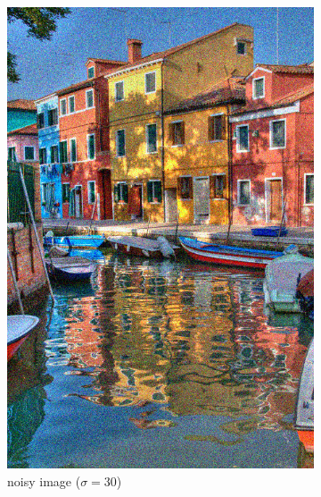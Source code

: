 \documentclass[a4paper, twocolumn, twoside]{article}
\begin{document}
\begin{figure}[h!]
\begin{subfigure}{.32\textwidth}
        \includegraphics[width=\linewidth]{images/noisy_30.png}
        \caption{noisy image ($\sigma = 30$)}
    \end{subfigure}
    \hfill
    \begin{subfigure}{.32\textwidth}
        \centering

\end{subfigure}
\end{figure}
\end{document}
